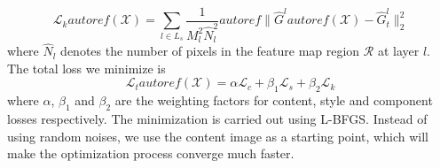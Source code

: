 \documentclass[10pt,twocolumn,letterpaper]{article}
\providecommand{\DIFdelbegin}{} %
\begin{document}
\begin{equation}
\mathcal{L}_{k} autoref( \mathcal{X} ) = \sum\limits_{l \in {L_s}} {\frac{1}{{M_l^2{\hat N}_l^2}}autoref\| {{{\hat G}^l}autoref( \mathcal{X} ) - {\hat G}_t^l} \|_2^2} 
\label{eq:component_loss}
\end{equation}
where ${\hat N}_l$ denotes the number of pixels in the feature map region $\mathcal R$ at layer $l$. The total loss we minimize is 
\begin{equation}
\mathcal{L}_{t}autoref( \mathcal{X} ) = \alpha \mathcal{L}_{c} + \beta_1 \mathcal{L}_{s} + \beta_2 \mathcal{L}_{k}
\label{eq:Total_loss}
\end{equation}
where $\alpha$, $\beta_1$ and $\beta_2$ are the weighting factors for content, style and component losses respectively. The minimization is carried out using L-BFGS. Instead of using random noises, we use the content image as a starting point, which will make the optimization process converge much faster. 
\DIFdelbegin %
\end{document}
